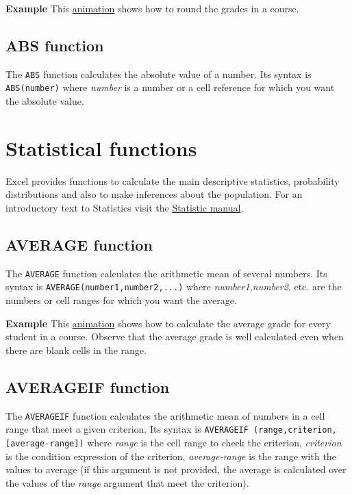 \textbf{Example} This \href{http://aprendeconalf.es/office/excel/manual/img/example_function_round.gif}{animation} shows how to round the grades in a course.

\subsection{ABS function}\hypertarget{abs-function}{}\label{abs-function}

The \texttt{ABS} function calculates the absolute value of a number. Its syntax is \texttt{ABS(number)} where \emph{number} is a number or a cell reference for which you want the absolute value.

\section{Statistical functions}\hypertarget{statistical-functions}{}\label{statistical-functions}

Excel provides functions to calculate the main descriptive statistics, probability distributions and also to make inferences about the population. 
For an introductory text to Statistics visit the \href{/estadistica/manual/}{Statistic manual}.

\subsection{AVERAGE function}\hypertarget{average-function}{}\label{average-function}

The \texttt{AVERAGE} function calculates the arithmetic mean of several numbers. Its syntax is \texttt{AVERAGE(number1,number2,...)} where \emph{number1,number2}, etc. are the numbers or cell ranges for which you want the average.

\textbf{Example} This \href{http://aprendeconalf.es/office/excel/manual/img/example_function_average.gif}{animation} shows how to calculate the average grade for every student in a course. Observe that the average grade is well calculated even when there are blank cells in the range.

\subsection{AVERAGEIF function}\hypertarget{averageif-function}{}\label{averageif-function}

The \texttt{AVERAGEIF} function calculates the arithmetic mean of numbers in a cell range that meet a given criterion. Its syntax is \texttt{AVERAGEIF	(range,criterion,[average-range])} where \emph{range} is the cell range to check the criterion, \emph{criterion} is the condition expression of the criterion, \emph{average-range} is the range with the values to average (if this argument is not provided, the average is calculated over the values of the \emph{range} argument that meet the criterion).

